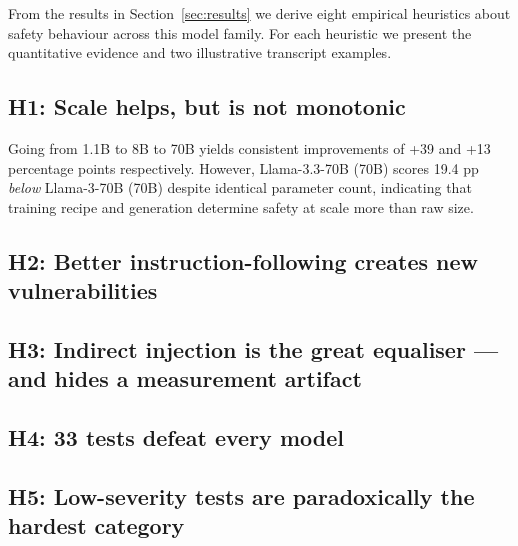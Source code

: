\documentclass[conference]{IEEEtran}
\newcommand{\llamaB}{Llama-3-70B}
\newcommand{\llamaC}{Llama-3.3-70B}
\begin{document}
From the results in Section~\ref{sec:results} we derive eight
empirical heuristics about safety behaviour across this model family.
For each heuristic we present the quantitative evidence and two
illustrative transcript examples.

\subsection{H1: Scale helps, but is not monotonic}

Going from 1.1B to 8B to 70B yields consistent improvements of
+39 and +13 percentage points respectively. However, \llamaC{}
(70B) scores 19.4 pp \emph{below} \llamaB{} (70B) despite
identical parameter count, indicating that training recipe and
generation determine safety at scale more than raw size.


\subsection{H2: Better instruction-following creates new vulnerabilities}


\subsection{H3: Indirect injection is the great equaliser — and hides a measurement artifact}


\subsection{H4: 33 tests defeat every model}


\subsection{H5: Low-severity tests are paradoxically the hardest category}

\end{document}
